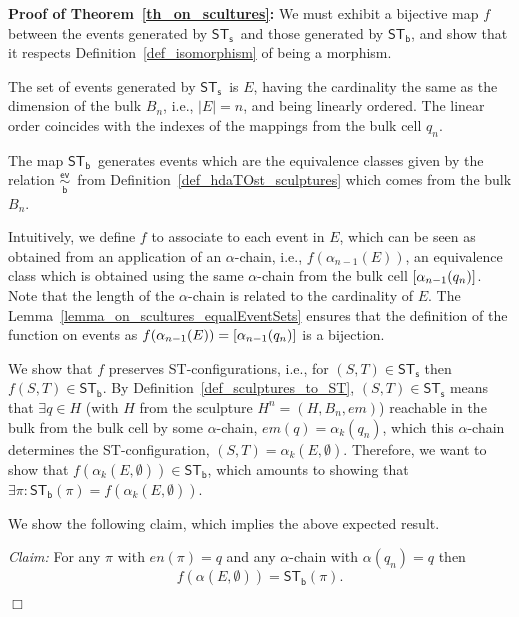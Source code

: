 \documentclass[submission,copyright,creativecommons]{eptcs}
\newenvironment{proof}[1][\!\!\,]{\vspace{1ex}\noindent\textbf{Proof #1: }}{\hfill$\Box$\vspace{2ex}}
\newcommand\sculpintost{\ensuremath{\mathsf{ST}_{\!\mathsf{s}}}}
\newcommand\hintostScultures{\ensuremath{\mathsf{ST}_{\!\mathsf{b}}}}
\newcommand\sculpture[2]{\ensuremath{#1^{#2}}}
\newcommand\embedMorphism{\ensuremath{\mathit{em}}}
\newcommand\finishPath[1]{\ensuremath{\mathit{en}(#1)}}
\newcommand\eventEquivHDAsculpture{\ensuremath{\overset{\mathsf{ev}}{\underset{\mathsf{b}}{\sim}}}}
\newcommand{\equivClass}[2][]{\ensuremath{[#2]\ifthenelse{\equal{#1}{}}{}{_{#1}}}}
\begin{document}
\begin{proof}[of Theorem~\ref{th_on_scultures}]
We must exhibit a bijective map $f$ between the events generated by \sculpintost\ and those generated by \hintostScultures, and show that it respects Definition~\ref{def_isomorphism} of being a morphism. 

The set of events generated by \sculpintost\ is $E$, having the cardinality the same as the dimension of the bulk $B_{n}$, i.e., $|E|=n$, and being linearly ordered. The linear order coincides with the indexes of the mappings from the bulk cell $q_{n}$. 

The map \hintostScultures\ generates events which are the equivalence classes given by the relation \eventEquivHDAsculpture\ from Definition~\ref{def_hdaTOst_sculptures} which comes from the bulk $B_{n}$.


Intuitively, we define $f$ to associate to each event in $E$, which can be seen as obtained from an application of an $\alpha$-chain, i.e., $f(\alpha_{n-1}(E))$, an equivalence class which is obtained using the same $\alpha$-chain from the bulk cell $\equivClass{\alpha_{n-1}(q_{n})}$. Note that the length of the $\alpha$-chain is related to the cardinality of $E$.
The Lemma~\ref{lemma_on_scultures_equalEventSets} ensures that the definition of the function on events as $f(\alpha_{n-1}(E))=\equivClass{\alpha_{n-1}(q_{n})}$ is a bijection.

We show that $f$ preserves ST-configurations, i.e., for $(S,T)\in\sculpintost$ then $f(S,T)\in\hintostScultures$.
By Definition~\ref{def_sculptures_to_ST}, $(S,T)\in\sculpintost$ means that $\exists q\in H$ (with $H$ from the sculpture $\sculpture{H}{n}=(H,B_{n},\embedMorphism)$) reachable in the bulk from the bulk cell by some $\alpha$-chain, $\embedMorphism(q)=\alpha_{k}(q_{n})$, which this $\alpha$-chain determines the ST-configuration, $(S,T)=\alpha_{k}(E,\emptyset)$.
Therefore, we want to show that $f(\alpha_{k}(E,\emptyset))\in\hintostScultures$, which amounts to showing that $\exists\pi:\hintostScultures(\pi)=f(\alpha_{k}(E,\emptyset))$.

We show the following claim, which implies the above expected result.

\vspace{1ex}
\noindent\textit{Claim:}\hspace{1ex} For any $\pi$ with $\finishPath{\pi}=q$ and any $\alpha$-chain with $\alpha(q_{n})=q$ then 
\[
f(\alpha(E,\emptyset))=\hintostScultures(\pi).
\]
\vspace{0.5ex}


\end{proof}
\end{document}
